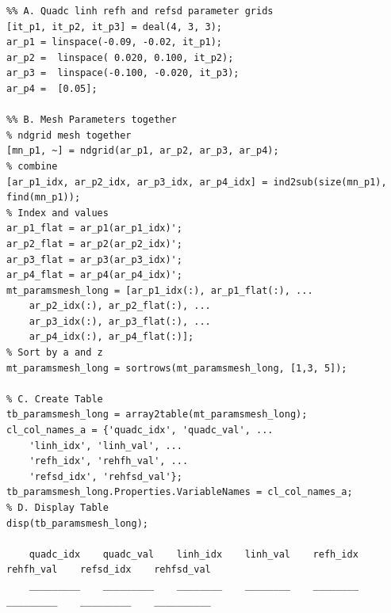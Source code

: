 \documentclass[
]{book}
\begin{document}
\begin{verbatim}
%% A. Quadc linh refh and refsd parameter grids
[it_p1, it_p2, it_p3] = deal(4, 3, 3);
ar_p1 = linspace(-0.09, -0.02, it_p1);
ar_p2 =  linspace( 0.020, 0.100, it_p2);
ar_p3 =  linspace(-0.100, -0.020, it_p3);
ar_p4 =  [0.05];

%% B. Mesh Parameters together
% ndgrid mesh together
[mn_p1, ~] = ndgrid(ar_p1, ar_p2, ar_p3, ar_p4);
% combine
[ar_p1_idx, ar_p2_idx, ar_p3_idx, ar_p4_idx] = ind2sub(size(mn_p1), find(mn_p1));
% Index and values
ar_p1_flat = ar_p1(ar_p1_idx)';
ar_p2_flat = ar_p2(ar_p2_idx)';
ar_p3_flat = ar_p3(ar_p3_idx)';
ar_p4_flat = ar_p4(ar_p4_idx)';
mt_paramsmesh_long = [ar_p1_idx(:), ar_p1_flat(:), ...
    ar_p2_idx(:), ar_p2_flat(:), ...
    ar_p3_idx(:), ar_p3_flat(:), ...
    ar_p4_idx(:), ar_p4_flat(:)];
% Sort by a and z
mt_paramsmesh_long = sortrows(mt_paramsmesh_long, [1,3, 5]);

% C. Create Table
tb_paramsmesh_long = array2table(mt_paramsmesh_long);
cl_col_names_a = {'quadc_idx', 'quadc_val', ...
    'linh_idx', 'linh_val', ...
    'refh_idx', 'rehfh_val', ...
    'refsd_idx', 'rehfsd_val'};
tb_paramsmesh_long.Properties.VariableNames = cl_col_names_a;
% D. Display Table
disp(tb_paramsmesh_long);

    quadc_idx    quadc_val    linh_idx    linh_val    refh_idx    rehfh_val    refsd_idx    rehfsd_val
    _________    _________    ________    ________    ________    _________    _________    __________


\end{verbatim}
\end{document}
